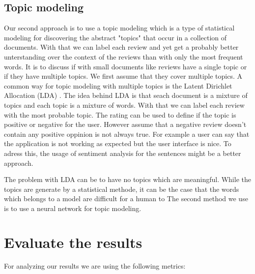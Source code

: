 \subsection{Topic modeling}
Our second approach is to use a topic modeling which is a type of statistical modeling for discovering the abstract "topics" that occur in a collection of documents.
With that we can label each review and yet get a probably better unterstanding over the context of the reviews than with only the most frequent words.
It is to discuss if with small documents like reviews have a single topic or if they have multiple topics.
We first assume that they cover multiple topics.
A common way for topic modeling with multiple topics is the Latent Dirichlet Allocation (LDA) \cite{blei2003latent}.
The idea behind LDA is that seach document is a mixture of topics and each topic is a mixture of words.
With that we can label each review with the most probable topic. The rating can be used to define if the topic is positive or negative for the user.
However assume that a negative review doesn't contain any positive oppinion is not always true.
For example a user can say that the application is not working as expected but the user interface is nice.
To adress this, the usage of sentiment analysis for the sentences might be a better approach.

The problem with LDA can be to have no topics which are meaningful.
While the topics are generate by a statistical methode, it can be the case that the words which belongs to a model are difficult for a human to
The second method we use is to use a neural network for topic modeling. 



\section{Evaluate the results}

For analyzing our results we are using the following metrics:
